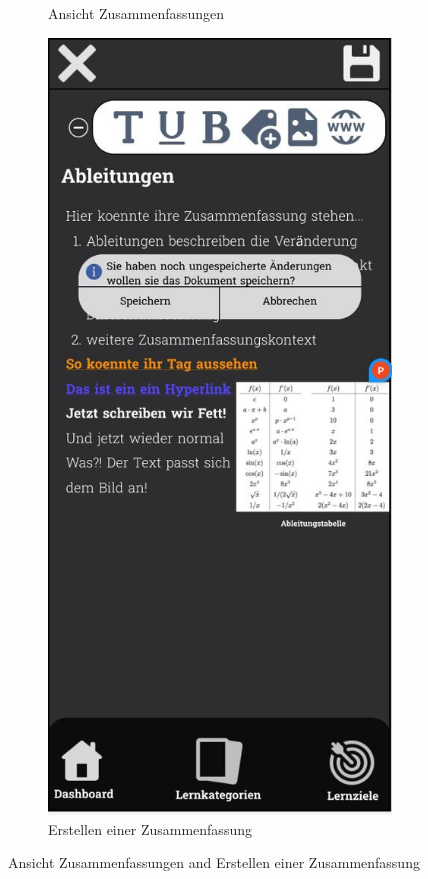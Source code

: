\begin{figure}[htbp]
\begin{subfigure}[b]{0.45\linewidth}
    \caption{Ansicht Zusammenfassungen}
    \label{fig:zusammenfassungen-ansicht}
  \end{subfigure}
  \hfill
  \begin{subfigure}[b]{0.45\linewidth}
    \centering
    \includegraphics[width=\linewidth]{images/Mockups/Summaries_Look.JPG}
    \caption{Erstellen einer Zusammenfassung}
    \label{fig:zusammenfassungen-erstellen}
  \end{subfigure}
  \caption{Ansicht Zusammenfassungen and Erstellen einer Zusammenfassung}
  \label{fig:zusammenfassungen}
\end{figure}

